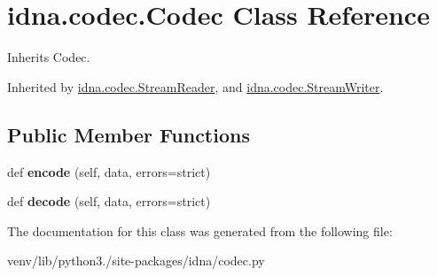 \hypertarget{classidna_1_1codec_1_1_codec}{}\section{idna.\+codec.\+Codec Class Reference}
\label{classidna_1_1codec_1_1_codec}


Inherits Codec.



Inherited by \hyperlink{classidna_1_1codec_1_1_stream_reader}{idna.\+codec.\+Stream\+Reader}, and \hyperlink{classidna_1_1codec_1_1_stream_writer}{idna.\+codec.\+Stream\+Writer}.

\subsection*{Public Member Functions}
\begin{DoxyCompactItemize}
\item 
\mbox{\label{classidna_1_1codec_1_1_codec_a9df4454bfb4ae1b9752176f2f903c6bd}} 
def {\bfseries encode} (self, data, errors=\textquotesingle{}strict\textquotesingle{})
\item 
\mbox{\label{classidna_1_1codec_1_1_codec_a9d264d3d74b322c5dc7e4f477e09e6c6}} 
def {\bfseries decode} (self, data, errors=\textquotesingle{}strict\textquotesingle{})
\end{DoxyCompactItemize}


The documentation for this class was generated from the following file\+:\begin{DoxyCompactItemize}
\item 
venv/lib/python3./site-\/packages/idna/codec.\+py\end{DoxyCompactItemize}
